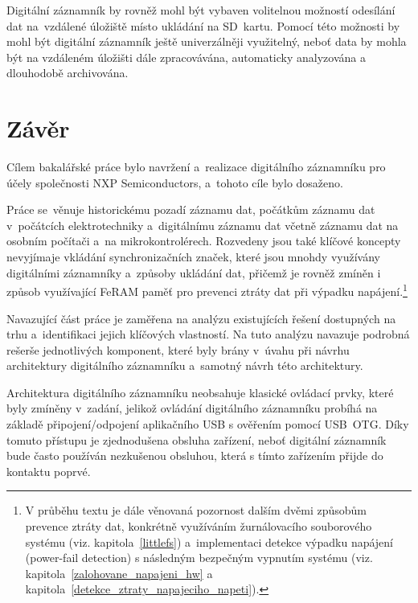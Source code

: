 Digitální záznamník by rovněž mohl být vybaven volitelnou možností odesílání dat na~vzdálené úložiště místo ukládání na SD~kartu. Pomocí této možnosti by mohl být digitální záznamník ještě univerzálněji využitelný, neboť data by mohla být na vzdáleném úložišti dále zpracovávána, automaticky analyzována a dlouhodobě archivována.



\chapter{Závěr}
\label{zaver}
Cílem bakalářské práce bylo navržení a~realizace digitálního záznamníku pro účely společnosti NXP Semiconductors, a~tohoto cíle bylo dosaženo.

Práce se~věnuje historickému pozadí záznamu dat, počátkům záznamu dat v~počátcích elektrotechniky a~digitálnímu záznamu dat včetně záznamu dat na osobním počítači a~na mikrokontrolérech. Rozvedeny jsou také klíčové koncepty nevyjímaje vkládání synchronizačních značek, které jsou mnohdy využívány digitálními záznamníky a~způsoby ukládání dat, přičemž je rovněž zmíněn i způsob využívající FeRAM paměť pro prevenci ztráty dat při výpadku napájení.\footnote{V průběhu textu je dále věnovaná pozornost dalším dvěmi způsobům prevence ztráty dat, konkrétně využíváním žurnálovacího souborového systému (viz. kapitola~\ref{littlefs}) a~implementaci detekce výpadku napájení (power-fail detection) s následným bezpečným vypnutím systému (viz. kapitola~\ref{zalohovane_napajeni_hw} a kapitola~\ref{detekce_ztraty_napajeciho_napeti}).}

Navazující část práce je zaměřena na analýzu existujících řešení dostupných na trhu a~identifikaci jejich klíčových vlastností. Na tuto analýzu navazuje podrobná rešerše jednotlivých komponent, které byly brány v~úvahu při návrhu architektury digitálního záznamníku a~samotný návrh této architektury.

Architektura digitálního záznamníku neobsahuje klasické ovládací prvky, které byly zmíněny v~zadání, jelikož ovládání digitálního záznamníku probíhá na základě připojení/odpojení aplikačního USB s ověřením pomocí USB~OTG. Díky tomuto přístupu je zjednodušena obsluha zařízení, neboť digitální záznamník bude často používán nezkušenou obsluhou, která s tímto zařízením přijde do kontaktu poprvé.

